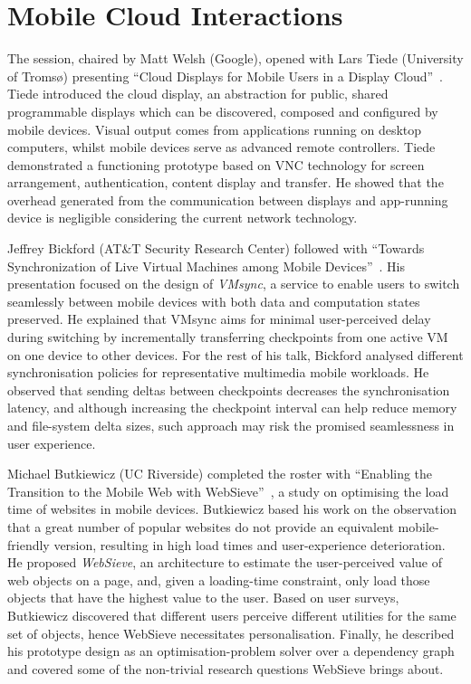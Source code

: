 \section{Mobile Cloud Interactions}
\label{sec:mobilecloud}

The session, chaired by Matt Welsh (Google), opened with Lars Tiede
(University of Tromsø) presenting ``Cloud Displays for Mobile Users in a
Display Cloud''~\cite{tiede13}. Tiede introduced the cloud display, an
abstraction for
public, shared programmable displays which can be discovered, composed
and configured by mobile devices. Visual output comes from
applications running on desktop computers, whilst mobile devices serve as
advanced remote controllers. Tiede demonstrated a functioning
prototype based on VNC technology for screen arrangement,
authentication, content display and transfer. He showed that the
overhead generated from the communication between displays and
app-running device is negligible considering the current network
technology.

Jeffrey Bickford (AT\&T Security Research Center) followed with
``Towards Synchronization of Live Virtual Machines among Mobile
Devices''~\cite{bickford13}. His presentation focused on the design of
\emph{VMsync}, a service to enable users to switch seamlessly between
mobile devices
with both data and computation states preserved. He explained that VMsync
aims for minimal user-perceived delay during switching by incrementally
transferring checkpoints from one active VM on one device to other
devices. For the rest of his talk, Bickford analysed different
synchronisation policies for representative multimedia mobile workloads.
He observed that sending deltas between checkpoints decreases the
synchronisation latency, and although increasing the checkpoint interval
can help reduce memory and file-system delta sizes, such approach may
risk the promised seamlessness in user experience.

Michael Butkiewicz (UC Riverside) completed the roster with ``Enabling
the Transition to the Mobile Web with WebSieve''~\cite{butkiewicz13}, a
study on optimising
the load time of websites in mobile devices. Butkiewicz based his work
on the observation that a great number of popular websites do
not provide an equivalent mobile-friendly version, resulting in high
load times and user-experience deterioration. He proposed
\emph{WebSieve}, an architecture to estimate the user-perceived value of
web objects on a page, and, given a loading-time constraint, only load 
those objects that have the highest value to the user. Based on user
surveys, Butkiewicz discovered that different users perceive different
utilities for the same set of objects, hence WebSieve necessitates
personalisation.  Finally, he described his prototype design as an
optimisation-problem solver over a dependency graph and covered
some of the non-trivial research questions WebSieve brings about.

